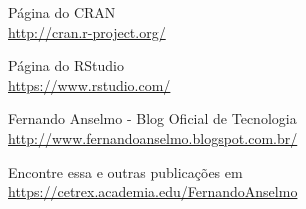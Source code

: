 \documentclass[a4paper,11pt]{article}
\begin{document}
\begin{thebibliography}{4}

  Página do CRAN \\
  \url{http://cran.r-project.org/}
  
  Página do RStudio \\
  \url{https://www.rstudio.com/}
  
  Fernando Anselmo - Blog Oficial de Tecnologia \\
  \url{http://www.fernandoanselmo.blogspot.com.br/}

  Encontre essa e outras publicações em \\
  \url{https://cetrex.academia.edu/FernandoAnselmo}

\end{thebibliography}
  
\end{document}

